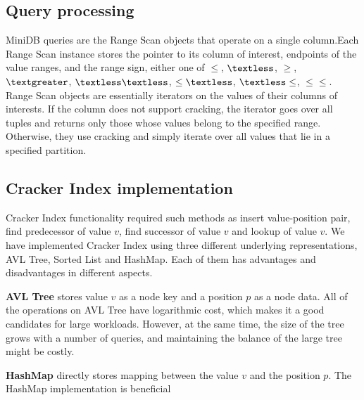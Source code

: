 \subsection{Query processing}
MiniDB queries are the Range Scan objects that operate on a single column.Each Range Scan instance stores the pointer to its column of interest, endpoints of the value ranges, and the range sign, either one of $\leq$, $\textless$, $\geq$, $\textgreater$, $\textless \textless$, $\leq \textless$, $\textless \leq$, $\leq \leq$. Range Scan objects are essentially iterators on the values of their columns of interests. If the column does not support cracking, the iterator goes over all tuples and returns only those whose values belong to the specified range. Otherwise, they use cracking and simply iterate over all values that lie in a specified partition. 


\subsection{Cracker Index implementation}
Cracker Index functionality required such methods as insert value-position pair, find predecessor of value $v$, find successor of value $v$ and lookup of value $v$. We have implemented Cracker Index using three different underlying representations, AVL Tree, Sorted List and HashMap. Each of them has advantages and disadvantages in different aspects.

\textbf{AVL Tree} stores value $v$ as a node key and a position $p$ as a node data. All of the operations on AVL Tree have logarithmic cost, which makes it a good candidates for large workloads. However, at the same time, the size of the tree grows with a number of queries, and maintaining the balance of the large tree might be costly.

\textbf{HashMap} directly stores mapping between the value $v$ and the position $p$. The HashMap implementation is beneficial 
